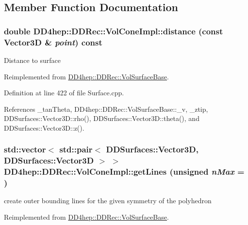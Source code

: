 \subsection{Member Function Documentation}
\hypertarget{class_d_d4hep_1_1_d_d_rec_1_1_vol_cone_impl_a28c958945f374cc59491e7ac4850bbde}{
\subsubsection[{distance}]{\setlength{\rightskip}{0pt plus 5cm}double DD4hep::DDRec::VolConeImpl::distance (const {\bf Vector3D} \& {\em point}) const}}
\label{class_d_d4hep_1_1_d_d_rec_1_1_vol_cone_impl_a28c958945f374cc59491e7ac4850bbde}
Distance to surface 

Reimplemented from \hyperlink{class_d_d4hep_1_1_d_d_rec_1_1_vol_surface_base_afb85bf6e8e6b87fb52e67e26609b1048}{DD4hep::DDRec::VolSurfaceBase}.

Definition at line 422 of file Surface.cpp.

References \_\-tanTheta, DD4hep::DDRec::VolSurfaceBase::\_\-v, \_\-ztip, DDSurfaces::Vector3D::rho(), DDSurfaces::Vector3D::theta(), and DDSurfaces::Vector3D::z().\hypertarget{class_d_d4hep_1_1_d_d_rec_1_1_vol_cone_impl_ae644bf91eb0b033f16ac4d89d00dd080}{
\subsubsection[{getLines}]{\setlength{\rightskip}{0pt plus 5cm}std::vector$<$ std::pair$<$ {\bf DDSurfaces::Vector3D}, {\bf DDSurfaces::Vector3D} $>$ $>$ DD4hep::DDRec::VolConeImpl::getLines (unsigned {\em nMax} = {})}}
\label{class_d_d4hep_1_1_d_d_rec_1_1_vol_cone_impl_ae644bf91eb0b033f16ac4d89d00dd080}


create outer bounding lines for the given symmetry of the polyhedron 

Reimplemented from \hyperlink{class_d_d4hep_1_1_d_d_rec_1_1_vol_surface_base_ad0863cf8ceb6a443a048fe89cdc79f26}{DD4hep::DDRec::VolSurfaceBase}.

